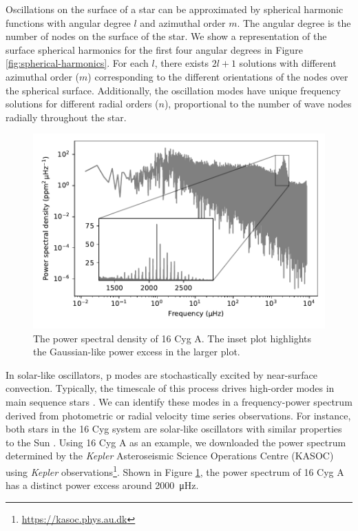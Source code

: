 Oscillations on the surface of a star can be approximated by spherical harmonic functions with angular degree \(l\) and azimuthal order \(m\). The angular degree is the number of nodes on the surface of the star. We show a representation of the surface spherical harmonics for the first four angular degrees in Figure \ref{fig:spherical-harmonics}. For each \(l\), there exists \(2l+1\) solutions with different azimuthal order (\(m\)) corresponding to the different orientations of the nodes over the spherical surface. Additionally, the oscillation modes have unique frequency solutions for different radial orders (\(n\)), proportional to the number of wave nodes radially throughout the star.

\begin{figure}[tb]
    \centering
    \includegraphics{figures/seismo-psd.pdf}
    \caption[The power spectral density of 16 Cyg A.]{The power spectral density of 16 Cyg A. The inset plot highlights the Gaussian-like power excess in the larger plot.}
    \label{fig:seismo-psd}
\end{figure}

In solar-like oscillators, p modes are stochastically excited by near-surface convection. Typically, the timescale of this process drives high-order modes in main sequence stars \needcite[\(n \sim 20\)]. We can identify these modes in a frequency-power spectrum derived from photometric or radial velocity time series observations. For instance, both stars in the 16 Cyg system are solar-like oscillators with similar properties to the Sun \needcite. Using 16 Cyg A as an example, we downloaded the power spectrum determined by the \emph{Kepler} Asteroseismic Science Operations Centre (KASOC) using \emph{Kepler} observations\footnote{\url{https://kasoc.phys.au.dk}}. Shown in Figure \ref{fig:seismo-psd}, the power spectrum of 16 Cyg A has a distinct power excess around \SI{2000}{\micro\hertz}. 


